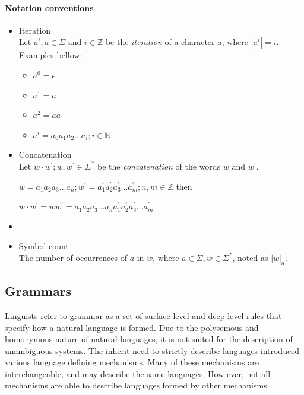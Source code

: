 \paragraph*{Notation conventions}



\begin{itemize}
\item Iteration\\
  Let $a^i; a \in \Sigma \text{ and } i \in \mathbb{Z}$ be the \emph{iteration} of a character $a$, where $|a^i| = i$.\\
Examples bellow:


\begin{itemize}
\item $a^0 = \epsilon$
\item $a^1 = a$
\item $a^2 = aa$
\item $a^i = a_0 a_1 a_2 \dots a_i; i \in \mathbb{N}$
\end{itemize}


\item Concatenation\\
  Let $w \cdot w^{'}; w, w^{'} \in \Sigma^{*}$ be the \emph{concatenation} of the words $w$ and $w^{'}$.

$w = a_1 a_2 a_3 \dots a_n ; w^{'} = a^{'}_1 a^{'}_2 a^{'}_3 \dots a^{'}_m; n,m \in \mathbb{Z}$ then  

$w\cdot w^{'} = w w^{'} = a_1 a_2 a_3 \dots a_n a^{'}_1 a^{'}_2 a^{'}_3 \dots a^{'}_m$


\item {}
\item Symbol count\\
The number of occurrences of $a$ in $w$, where $a \in \Sigma, w \in \Sigma^{*}$, noted as $|w|_{a}$.

\end{itemize}

\subsection{Grammars}
Linguists refer to grammar as a set of surface level and deep level rules that specify how a natural language is formed. Due to the polysemous and homonymous nature of natural languages, it is not suited for the description of unambiguous systems. The inherit need to strictly describe languages introduced various language defining mechanisms. Many of these mechanisms are interchangeable, and may describe the same languages. How ever, not all mechanisms are able to describe languages formed by other mechanisms.

